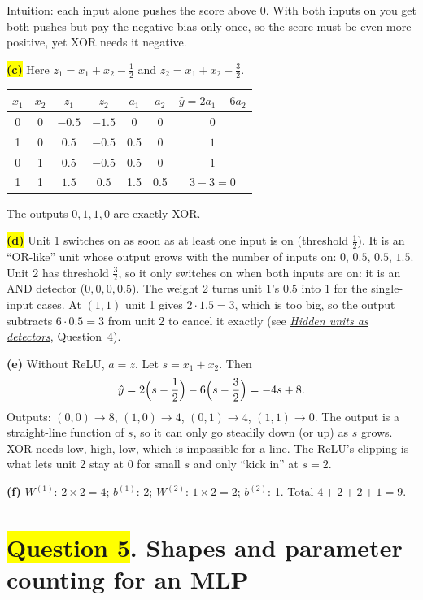 \documentclass[12pt,a4paper]{article}
\newcommand{\seeconcept}[3]{(see \hyperref[#1]{\textit{#2}}, Question~#3)}
\newcommand{\hlq}[1]{{\setlength{\fboxsep}{1.5pt}\colorbox{yellow}{#1}}}
\begin{document}
Intuition: each input alone pushes the score above 0. With both inputs on you get both pushes but pay the negative bias only once, so the score must be even more positive, yet XOR needs it negative.

\hlq{\textbf{(c)}} Here $z_1=x_1+x_2-\tfrac12$ and $z_2=x_1+x_2-\tfrac32$.
\begin{center}
\begin{tabular}{@{}cc|cc|cc|c@{}}
\toprule
$x_1$&$x_2$&$z_1$&$z_2$&$a_1$&$a_2$&$\hat y=2a_1-6a_2$\\
\midrule
0&0&$-0.5$&$-1.5$&0&0&$0$\\
1&0&$0.5$&$-0.5$&0.5&0&$1$\\
0&1&$0.5$&$-0.5$&0.5&0&$1$\\
1&1&$1.5$&$0.5$&1.5&0.5&$3-3=0$\\
\bottomrule
\end{tabular}
\end{center}
The outputs $0,1,1,0$ are exactly XOR.

\hlq{\textbf{(d)}} Unit 1 switches on as soon as at least one input is on (threshold $\tfrac12$). It is an ``OR-like'' unit whose output grows with the number of inputs on: $0,\,0.5,\,0.5,\,1.5$. Unit 2 has threshold $\tfrac32$, so it only switches on when both inputs are on: it is an AND detector ($0,0,0,0.5$). The weight 2 turns unit 1's $0.5$ into 1 for the single-input cases. At $(1,1)$ unit 1 gives $2\cdot1.5=3$, which is too big, so the output subtracts $6\cdot0.5=3$ from unit 2 to cancel it exactly \seeconcept{c:detectors}{Hidden units as detectors}{4}.

\textbf{(e)} Without ReLU, $a=z$. Let $s=x_1+x_2$. Then
\[
\hat y=2\Bigl(s-\frac12\Bigr)-6\Bigl(s-\frac32\Bigr)=-4s+8 .
\]
Outputs: $(0,0)\to8$, $(1,0)\to4$, $(0,1)\to4$, $(1,1)\to0$. The output is a straight-line function of $s$, so it can only go steadily down (or up) as $s$ grows. XOR needs low, high, low, which is impossible for a line. The ReLU's clipping is what lets unit 2 stay at 0 for small $s$ and only ``kick in'' at $s=2$.

\textbf{(f)} $W^{(1)}$: $2\times2=4$; $b^{(1)}$: 2; $W^{(2)}$: $1\times2=2$; $b^{(2)}$: 1. Total $4+2+2+1=9$.

\section[Question 5. Shapes and parameter counting for an MLP]{\hlq{Question 5}. Shapes and parameter counting for an MLP}
\end{document}

